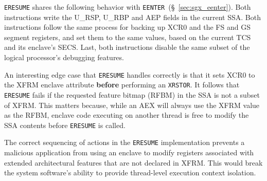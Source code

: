 \texttt{ERESUME} shares the following behavior with
\texttt{EENTER}~(\S~\ref{sec:sgx_eenter}). Both instructions write the U\_RSP,
U\_RBP and AEP fields in the current SSA. Both instructions follow the same
process for backing up XCR0 and the FS and GS segment registers, and set them
to the same values, based on the current TCS and its enclave's SECS. Last, both
instructions disable the same subset of the logical processor's debugging
features.

An interesting edge case that \texttt{ERESUME} handles correctly is that it
sets XCR0 to the XFRM enclave attribute \textbf{before} performing an
\texttt{XRSTOR}. It follows that \texttt{ERESUME} fails if the requested
feature bitmap (RFBM) in the SSA is not a subset of XFRM. This matters because,
while an AEX will always use the XFRM value as the RFBM, enclave code executing
on another thread is free to modify the SSA contents before \texttt{ERESUME} is
called.

The correct sequencing of actions in the \texttt{ERESUME} implementation
prevents a malicious application from using an enclave to modify registers
associated with extended architectural features that are not declared in XFRM.
This would break the system software's ability to provide thread-level
execution context isolation.
